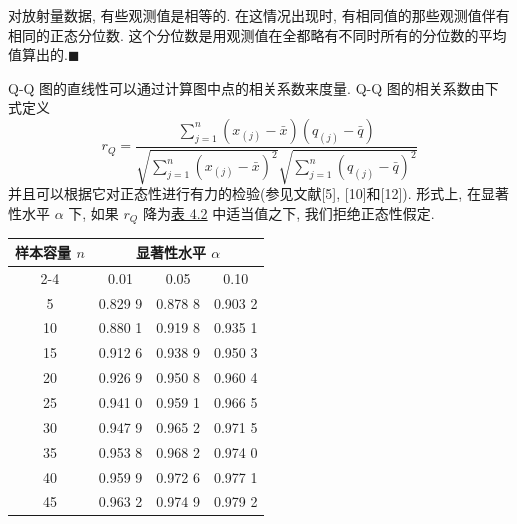 对放射量数据, 有些观测值是相等的. 在这情况出现时, 有相同值的那些观测值伴有相同的正态分位数. 这个分位数是用观测值在全都略有不同时所有的分位数的平均值算出的.\hfill$\blacksquare$

Q-Q 图的直线性可以通过计算图中点的相关系数来度量. Q-Q 图的相关系数由下式定义
\label{eq:4-31}
\begin{equation}
r_{Q}=\frac{\sum_{j=1}^{n}(x_{(j)}-\bar{x})(q_{(j)}-\bar{q})}{\sqrt{\sum_{j=1}^{n}(x_{(j)}-\bar{x})^{2}}\sqrt{\sum_{j=1}^{n}(q_{(j)}-\bar{q})^{2}}} \tag{4-31}
\end{equation}
并且可以根据它对正态性进行有力的检验(参见文献[5], [10]和[12]). 形式上, 在显著性水平 $\alpha$ 下, 如果 $r_{Q}$ 降为\hyperref[tab:4.2]{表 4.2} 中适当值之下, 我们拒绝正态性假定.

\begin{mvtable}
\label{tab:4.2}
\begin{tabular}{cccc}
\toprule
\multirow{2}{*}{样本容量 $n$} & \multicolumn{3}{c}{显著性水平 $\alpha$} \\
\cmidrule(lr){2-4}
 & 0.01 & 0.05 & 0.10 \\
\midrule
5 & 0.829 9 & 0.878 8 & 0.903 2 \\
10 & 0.880 1 & 0.919 8 & 0.935 1 \\
15 & 0.912 6 & 0.938 9 & 0.950 3 \\
20 & 0.926 9 & 0.950 8 & 0.960 4 \\
25 & 0.941 0 & 0.959 1 & 0.966 5 \\
30 & 0.947 9 & 0.965 2 & 0.971 5 \\
35 & 0.953 8 & 0.968 2 & 0.974 0 \\
40 & 0.959 9 & 0.972 6 & 0.977 1 \\
45 & 0.963 2 & 0.974 9 & 0.979 2 \\
\bottomrule
\end{tabular}
\end{mvtable}
